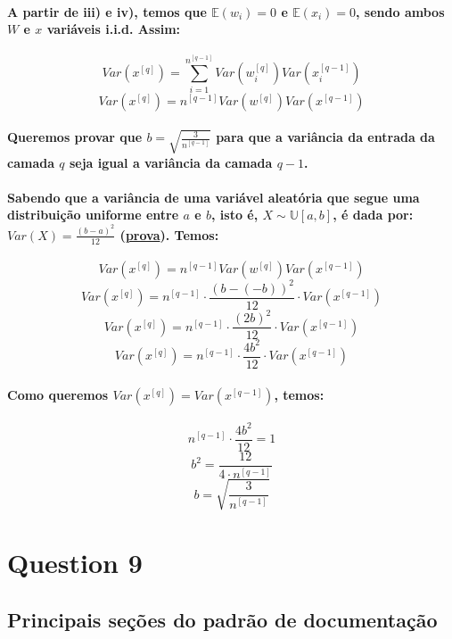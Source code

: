 \documentclass[a4paper]{article}    %
\begin{document}
\paragraph{A partir de iii) e iv), temos que $\mathbb{E}(w_i) = 0$ e $\mathbb{E}(x_i) = 0$, sendo ambos $W$ e $x$ variáveis i.i.d. Assim:}
\[Var(x^{[q]}) = \sum_{i=1}^{n^{[q-1]}} Var(w_i^{[q]})Var(x_i^{[q-1]})\]
\[\boxed{Var(x^{[q]}) = n^{[q-1]} Var(w^{[q]})Var(x^{[q-1]})}\]

\paragraph{Queremos provar que $b = \sqrt{\frac{3}{n^{[q-1]}}}$ para que a variância da entrada da camada $q$ seja igual a variância da camada $q-1$.}

\paragraph{Sabendo que a variância de uma variável aleatória que segue uma distribuição uniforme entre $a$ e $b$, isto é, $X \sim \mathbb{U}[a,b]$, é dada por: $Var(X) = \frac{(b-a)^2}{12}$ (\href{https://proofwiki.org/wiki/Variance_of_Continuous_Uniform_Distribution}{prova}). Temos:}
\[Var(x^{[q]}) = n^{[q-1]} Var(w^{[q]})Var(x^{[q-1]})\]
\[Var(x^{[q]}) = n^{[q-1]} \cdot \frac{(b-(-b))^2}{12} \cdot Var(x^{[q-1]})\]
\[Var(x^{[q]}) = n^{[q-1]} \cdot \frac{(2b)^2}{12} \cdot Var(x^{[q-1]})\]
\[Var(x^{[q]}) = n^{[q-1]} \cdot \frac{4b^2}{12} \cdot Var(x^{[q-1]})\]

\paragraph{Como queremos $Var(x^{[q]}) = Var(x^{[q-1]})$, temos:}
\[n^{[q-1]} \cdot \frac{4b^2}{12} = 1\]
\[b^2 = \frac{12}{4 \cdot n^{[q-1]}}\]
\[\boxed{b = \sqrt{\frac{3}{n^{[q-1]}}}}\]

\newpage
\setcounter{section}{9}
\setcounter{subsection}{0}
\section*{Question 9}

\subsection{Principais seções do padrão de documentação}
\end{document}

